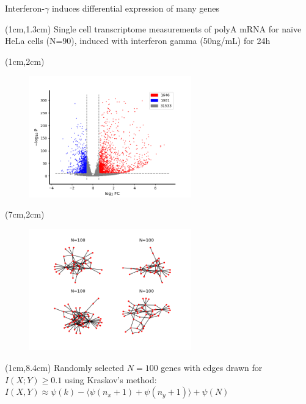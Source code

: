 \documentclass[aspectratio=1610]{beamer}					%
\begin{document}
\begin{frame}{Interferon-$\gamma$ induces differential expression of many genes}

\begin{textblock*}{14cm}(1cm,1.3cm)
Single cell transcriptome measurements of polyA mRNA for naïve HeLa cells (N=90), induced with interferon gamma (50ng/mL) for 24h

\end{textblock*}

\begin{textblock*}{7cm}(1cm,2cm)
\begin{figure}
\includegraphics[width=7cm]{volcano.png}
\end{figure}
\end{textblock*}

\begin{textblock*}{7cm}(7cm,2cm)
\begin{figure}
\includegraphics[width=7cm]{graphs.png}
\end{figure}
\end{textblock*}

\begin{textblock*}{14cm}(1cm,8.4cm)
Randomly selected $N=100$ genes with edges drawn for $I(X;Y) \geq 0.1$ using Kraskov's method: $I(X,Y) \approx \psi(k) - \langle\psi(n_{x}+1) + \psi(n_{y}+1)\rangle + \psi(N)$
\end{textblock*}

\end{frame}
\end{document}
